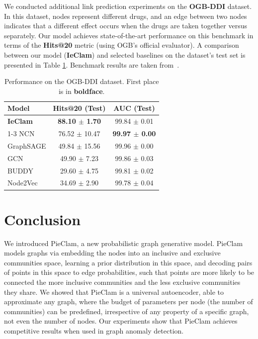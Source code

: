 \documentclass{article}
\theoremstyle{plain}
\theoremstyle{definition}
\theoremstyle{remark}
\newcommand{\ron}[1]{{{\textcolor{red}{\textbf{[Ron:} {#1}\textbf{]}}}}}
\begin{document}
We conducted additional link prediction experiments on the \textbf{OGB-DDI} dataset. In this dataset, nodes represent different drugs, and an edge between two nodes indicates that a different effect occurs when the drugs are taken together versus separately. Our model achieves state-of-the-art performance on this benchmark in terms of the \textbf{Hits@20} metric (using OGB's official evaluator). 
A comparison between our model (\textbf{IeClam}) and selected baselines on the dataset's test set is presented in Table \ref{table:ddi-results}. Benchmark results are taken from~\cite{zhang2022unsupervised,li2023evaluating,tan2022mgae}. 
\begin{table}[t]
 \footnotesize
    \centering
    \begin{tabular}{|l|c|c|}
        \hline
        \textbf{Model} & \textbf{Hits@20 (Test)} & \textbf{AUC (Test)} \\
        \hline
        \textbf{IeClam}   & \textbf{88.10 $\pm$ 1.70} & 99.84 $\pm$ 0.01 \\
        \cline{1-3}
        NCN              & 76.52 $\pm$ 10.47 & \textbf{99.97 $\pm$ 0.00} \\
        GraphSAGE        & 49.84 $\pm$ 15.56 & 99.96 $\pm$ 0.00 \\
        GCN              & 49.90 $\pm$ 7.23  & 99.86 $\pm$ 0.03 \\
        BUDDY            & 29.60 $\pm$ 4.75  & 99.81 $\pm$ 0.02 \\
        Node2Vec         & 34.69 $\pm$ 2.90  & 99.78 $\pm$ 0.04 \\
        \hline
    \end{tabular}
    \caption{Performance on the OGB-DDI dataset. First place is in \textbf{boldface}.}
    \label{table:ddi-results}
\end{table}




\section{Conclusion}

We introduced PieClam, a new probabilistic graph generative model. PieClam models graphs via embedding the nodes into an inclusive and exclusive communities space, learning a prior distribution in this space, and decoding pairs of points in this space to edge probabilities, such that points are more likely to be connected the more inclusive communities and the less exclusive communities they share. We showed that PieClam is a universal autoencoder, able to approximate any graph, where the budget of parameters per node (the number of communities) can be predefined, irrespective of any property of a specific graph, not even the number of nodes. Our experiments show that PieClam achieves competitive results when used in graph anomaly detection.
\end{document}
